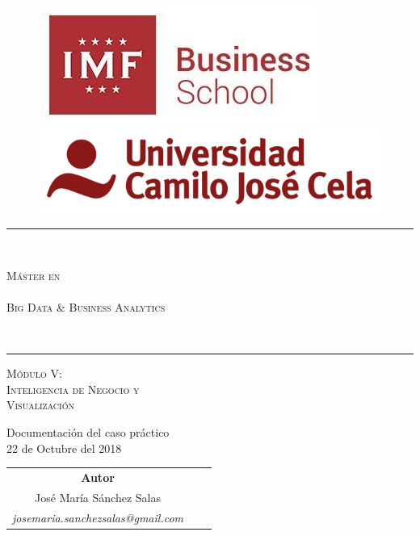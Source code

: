 \documentclass[a4paper,10pt,titlepage,oneside,openright]{book}
\begin{document}
\thispagestyle{empty}
\begin{figure}[h]
\includegraphics[scale=0.3]{logo-imf.png} \hspace{80mm}
\includegraphics[scale=0.25]{logo-ucjc.png}
\centering
\end{figure}

\vspace{5mm}

\begin{center}
\rule{150mm}{0.1mm} \\
\vspace{5mm}
\begin{Huge}
 \textsc{Máster en \\ ~ \\ Big Data \& Business Analytics}
\end{Huge}
\vspace{5mm} \\
\rule{150mm}{0.5mm}

\vspace{20mm}

\begin{huge}
  \textsc{Módulo V: \\ Inteligencia de Negocio y \\ Visualización} \\ \vspace{15mm}
\end{huge}

\begin{LARGE}
 Documentación del caso práctico\\ \vspace{5mm}
 {\large 22 de Octubre del 2018}
\end{LARGE}

\vspace{25mm}

\begin{Large}
\begin{center}
\begin{tabular}{ccc}
\textbf{Autor} \\
José María Sánchez Salas \\
\textit{josemaria.sanchezsalas@gmail.com}
\end{tabular}
\end{center}
\end{Large}
\end{center}
\newpage
\thispagestyle{empty}
\end{document}
